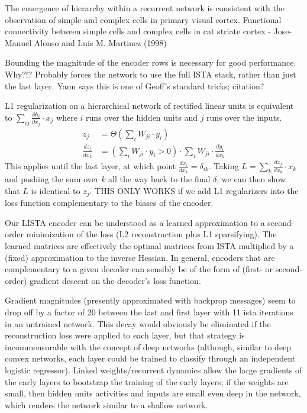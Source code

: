The emergence of hierarchy within a recurrent network is consistent with the observation of simple and complex cells in primary visual cortex.  
Functional connectivity between simple cells and complex cells in cat striate cortex - Jose-Manuel Alonso and Luis M. Martinez (1998)

Bounding the magnitude of the encoder rows is necessary for good performance.  Why?!?  Probably forces the network to use the full ISTA stack, rather than just the last layer.  Yann says this is one of Geoff's standard tricks; citation?

L1 regularization on a hierarchical network of rectified linear units is equivalent to $\sum_{ij} \frac{\partial h_i}{\partial x_j} \cdot x_j$ where $i$ runs over the hidden units and $j$ runs over the inputs.  
\begin{align*}
z_j &= \Theta\left(\sum_i W_{ji} \cdot y_i \right) \\
\frac{d z_j}{d x_k} &= \left( \sum_i W_{ji} \cdot y_i > 0 \right) \cdot \sum_i W_{ji} \cdot \frac{d y_i}{d x_k} 
\end{align*}
This applies until the last layer, at which point $\frac{d x_i}{d x_k} = \delta_{ik}$.  Taking $L = \sum_k \frac{d z_j}{d x_k} \cdot x_k$ and pushing the sum over $k$ all the way back to the final $\delta$, we can then show that $L$ is identical to $z_j$.  THIS ONLY WORKS if we add L1 regularizers into the loss function complementary to the biases of the encoder.

Our LISTA encoder can be understood as a learned approximation to a second-order minimization of the loss (L2 reconstruction plus L1 sparsifying).  The learned matrices are effectively the optimal matrices from ISTA multiplied by a (fixed) approximation to the inverse Hessian.  In general, encoders that are complementary to a given decoder can sensibly be of the form of (first- or second-order) gradient descent on the decoder's loss function. 

Gradient magnitudes (presently approximated with backprop messages) seem to drop off by a factor of 20 between the last and first layer with 11 ista iterations in an untrained network.  This decay would obviously be eliminated if the reconstruction loss were applied to each layer, but that strategy is incommensurable with the concept of deep networks (although, similar to deep convex networks, each layer could be trained to classify through an independent logistic regressor).  Linked weights/recurrent dynamics allow the large gradients of the early layers to bootstrap the training of the early layers; if the weights are small, then hidden units activities and inputs are small even deep in the network, which renders the network similar to a shallow network.

